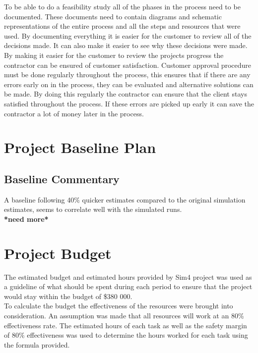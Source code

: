 \noindent
To be able to do a feasibility study all of the phases in the process need to be documented. These documents need to contain diagrams and schematic representations of the entire process and all the steps and resources that were used. By documenting everything it is easier for the customer to review all of the decisions made. It can also make it easier to see why these decisions were made. By making it easier for the customer to review the projects progress the contractor can be ensured of customer satisfaction. Customer approval procedure must be done regularly throughout the process, this ensures that if there are any errors early on in the process, they can be evaluated and alternative solutions can be made. By doing this regularly the contractor can ensure that the client stays satisfied throughout the process. If these errors are picked up early it can save the contractor a lot of money later in the process.

\newpage
\section{Project Baseline Plan}
\subsection{Baseline Commentary}

A baseline following 40\% quicker estimates compared to the original simulation estimates, seems to correlate well with the simulated runs.\\

\textbf{*need more*}

\newpage
\section{Project Budget}

The estimated budget and estimated hours provided by Sim4 project was used as a guideline of what should be spent during each period to ensure that the project would stay within the budget of \$380 000.\\

\noindent
To calculate the budget the effectiveness of the resources were brought into consideration. An assumption was made that all resources will work at an 80\% effectiveness rate. The estimated hours of each task as well as the safety margin of 80\% effectiveness was used to determine the hours worked for each task using the formula provided.


